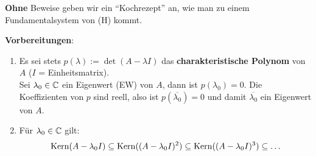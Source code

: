 \documentclass[a4paper,oneside,DIV15,BCOR12mm,chapterprefix=true,headings=onelinechapter]{scrbook}
\begin{document}
\textbf{Ohne} Beweise geben wir ein "`Kochrezept"' an, wie man zu einem Fundamentalsystem von (H) kommt.

\textbf{Vorbereitungen}: 
\begin{enumerate}
\item Es sei stets $p(\lambda) := \det(A - \lambda I)$ das \textbf{charakteristische Polynom}
von $A$ ($I$ = Einheitsmatrix). \\
Sei $\lambda_0 \in \mathbb{C}$ ein Eigenwert (EW) von $A$, dann 
ist $p(\lambda_0) = 0$. Die Koeffizienten von $p$ sind reell, also ist $p(\overline{\lambda_0}) = 0$
und damit $\overline{\lambda_0}$ ein Eigenwert von $A$.
\item Für $\lambda_0 \in \mathbb{C}$ gilt: 
\[\mathop{\rm Kern}\nolimits(A-\lambda_0 I) \subseteq \mathop{\rm Kern}\nolimits((A-\lambda_0 I)^2) \subseteq \mathop{\rm Kern}\nolimits((A-\lambda_0 I)^3) \subseteq \ldots\]
\end{enumerate} 
\end{document}
